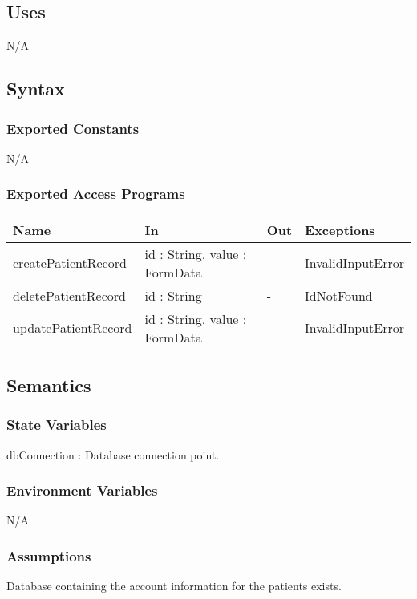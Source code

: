 \documentclass[12pt, titlepage]{article}
\begin{document}
\subsection{Uses}
N/A

\subsection{Syntax}

\subsubsection{Exported Constants}
N/A

\subsubsection{Exported Access Programs}

\begin{center}
\begin{tabular}{p{4cm} p{4.5cm} p{1cm} p{2.5cm}}
\hline
\textbf{Name} & \textbf{In} & \textbf{Out} & \textbf{Exceptions} \\
\hline
createPatientRecord & id : String, value : FormData & - & InvalidInputError \\
deletePatientRecord & id : String & - & IdNotFound\\
updatePatientRecord & id : String, value : FormData & - & InvalidInputError \\
\hline
\end{tabular}
\end{center}

\subsection{Semantics}

\subsubsection{State Variables}
dbConnection : Database connection point.

\subsubsection{Environment Variables}
N/A

\subsubsection{Assumptions}
Database containing the account information for the patients exists.
\end{document}
